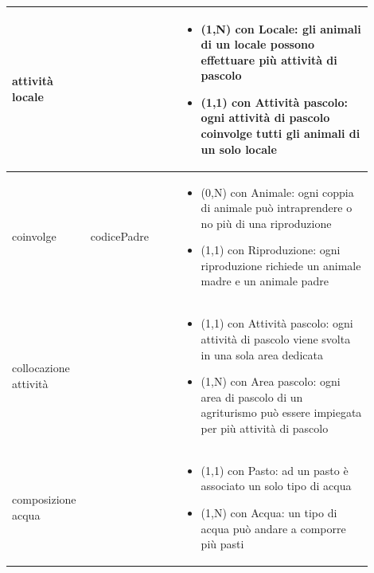 \documentclass[12pt,a4paper]{article}
\begin{document}
\begin{center}
\begin{longtable}{|p{0.16\linewidth}|p{0.24\linewidth}|p{0.50\linewidth}|}
\hline
attività locale 				& \begin{flushleft}\vspace{-15pt}  \end{flushleft}
					& \begin{itemize}
						\setlength{\itemindent}{-1em}
						\vspace{-25pt}
						\setlength\itemsep{-0.25em}
						\item (1,N) con Locale: gli animali di un locale possono effettuare più attività di pascolo
						\item (1,1) con Attività pascolo: ogni attività di pascolo coinvolge tutti gli animali di un solo locale
					\end{itemize}\\ 

\hline
coinvolge				& \begin{flushleft}\vspace{-25pt} codicePadre \end{flushleft}
					& \begin{itemize}
						\setlength{\itemindent}{-1em}
						\vspace{-25pt}
						\setlength\itemsep{-0.25em}
						\item (0,N) con Animale: ogni coppia di animale può intraprendere o no più di una riproduzione
						\item (1,1) con Riproduzione: ogni riproduzione richiede un animale madre e un animale padre
					\end{itemize}\\ 

\hline
collocazione attività 				& \begin{flushleft}\vspace{-15pt}  \end{flushleft}
					& \begin{itemize}
						\setlength{\itemindent}{-1em}
						\vspace{-25pt}
						\setlength\itemsep{-0.25em}
						\item (1,1) con Attività pascolo: ogni attività di pascolo viene svolta in una sola area dedicata
						\item (1,N) con Area pascolo: ogni area di pascolo di un agriturismo può essere impiegata per più attività di pascolo
					\end{itemize}\\ 

\hline
composizione acqua 				& \begin{flushleft}\vspace{-15pt}  \end{flushleft}
					& \begin{itemize}
						\setlength{\itemindent}{-1em}
						\vspace{-25pt}
						\setlength\itemsep{-0.25em}
						\item (1,1) con Pasto: ad un pasto è associato un solo tipo di acqua
						\item (1,N) con Acqua: un tipo di acqua può andare a comporre più pasti
					\end{itemize}\\ 


\end{longtable}
\end{center}
\end{document}
